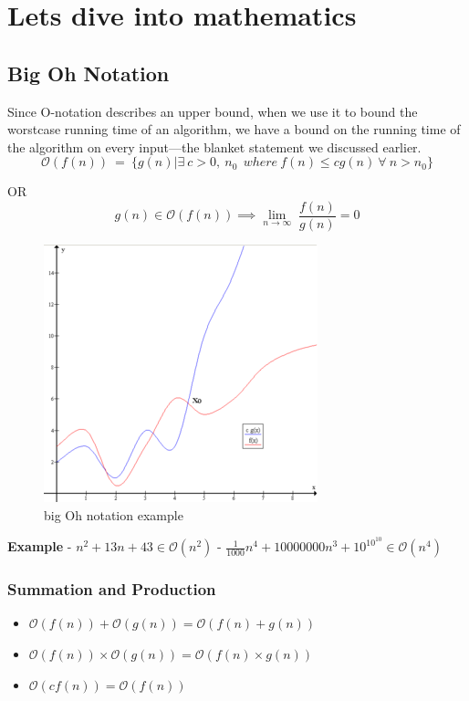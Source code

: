 \documentclass[11pt]{article}
\providecommand{\tightlist}{%
      \setlength{\itemsep}{0pt}\setlength{\parskip}{0pt}}
\begin{document}
    \hypertarget{lets-dive-into-mathematics}{%
\section{Lets dive into mathematics}\label{lets-dive-into-mathematics}}

    \hypertarget{big-oh-notation}{%
\subsection{Big Oh Notation}\label{big-oh-notation}}

Since O-notation describes an upper bound, when we use it to bound the
worstcase running time of an algorithm, we have a bound on the running
time of the algorithm on every input---the blanket statement we
discussed earlier. \[
\mathcal{O}( f( n)) \ =\ \{g( n) |\exists \ c >0,\ n_{0} \ \ where\ f( n) \leqslant cg( n) \ \forall \ n >n_{0}\}
\]

OR \[
g(n)\in \mathcal{O}( f( n))\implies \lim_{n \to \infty}\;\frac{f(n)}{g(n)} = 0
\]

\begin{figure}
\centering
\includegraphics{300px-Big-O-notation.png}
\caption{big Oh notation example}
\end{figure}

\textbf{Example} - \(n^2+13n+43\in \mathcal{O}(n^2)\) -
\(\frac{1}{1000}n^4+10000000n^3+10^{10^{10}}\in \mathcal{O}(n^4)\)

\hypertarget{summation-and-production}{%
\subsubsection{Summation and
Production}\label{summation-and-production}}

\begin{itemize}
\tightlist
\item
  \(\mathcal{O}( f( n)) +\mathcal{O}( g( n)) =\mathcal{O}( f( n) +g( n))\)
\item
  \(\mathcal{O}( f( n)) \times \mathcal{O}( g( n)) =\mathcal{O}( f( n) \times g( n))\)
\item
  \(\mathcal{O}( cf( n)) =\mathcal{O}( f( n))\)
\end{itemize}
\end{document}
